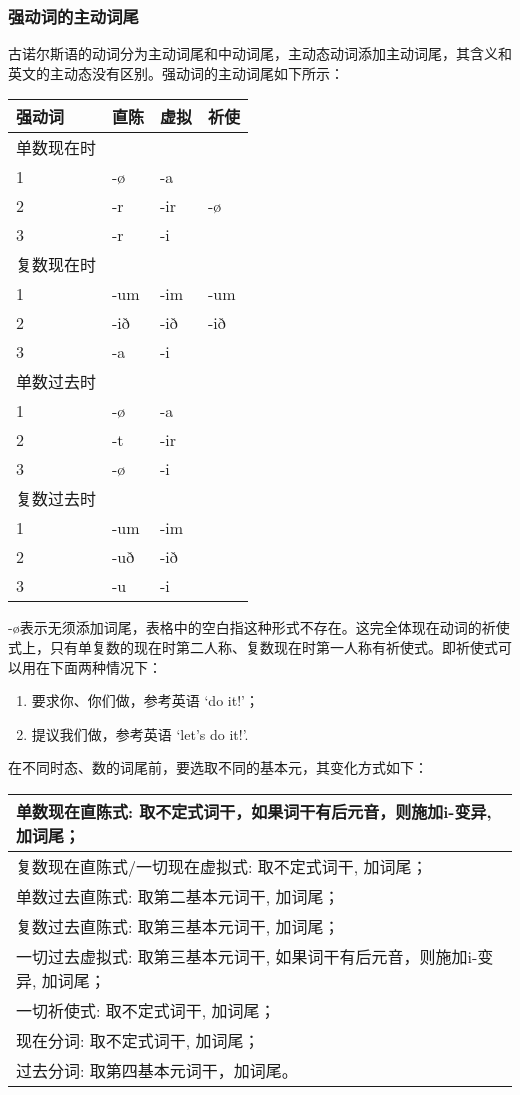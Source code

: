 \subsubsection{强动词的主动词尾}\label{ux5f3aux52a8ux8bcdux7684ux4e3bux52a8ux8bcdux5c3e}

古诺尔斯语的动词分为主动词尾和中动词尾，主动态动词添加主动词尾，其含义和英文的主动态没有区别。强动词的主动词尾如下所示：

\begin{longtable}{llll}
\toprule
强动词 & 直陈 & 虚拟 & 祈使 \\
\midrule
\endhead
\bottomrule
\endfoot
单数现在时 & & & \\
1 & -ø & -a & \\
2 & -r & -ir & -ø \\
3 & -r & -i & \\
复数现在时 & & & \\
1 & -um & -im & -um \\
2 & -ið & -ið & -ið \\
3 & -a & -i & \\
单数过去时 & & & \\
1 & -ø & -a & \\
2 & -t & -ir & \\
3 & -ø & -i & \\
复数过去时 & & & \\
1 & -um & -im & \\
2 & -uð & -ið & \\
3 & -u & -i & \\
\end{longtable}

-ø表示无须添加词尾，表格中的空白指这种形式不存在。这完全体现在动词的祈使式上，只有单复数的现在时第二人称、复数现在时第一人称有祈使式。即祈使式可以用在下面两种情况下：

\begin{enumerate}
\def\labelenumi{\arabic{enumi})}
\item
  要求你、你们做，参考英语 `do it!'；
\item
  提议我们做，参考英语 `let's do it!'.
\end{enumerate}

在不同时态、数的词尾前，要选取不同的基本元，其变化方式如下：

\begin{longtable}{l}
\toprule
单数现在直陈式: 取不定式词干，如果词干有后元音，则施加i-变异, 加词尾； \\
\midrule
\endhead
\bottomrule
\endfoot
复数现在直陈式/一切现在虚拟式: 取不定式词干, 加词尾； \\
单数过去直陈式: 取第二基本元词干, 加词尾； \\
复数过去直陈式: 取第三基本元词干, 加词尾； \\
一切过去虚拟式: 取第三基本元词干, 如果词干有后元音，则施加i-变异,
加词尾； \\
一切祈使式: 取不定式词干, 加词尾； \\
现在分词: 取不定式词干, 加词尾； \\
过去分词: 取第四基本元词干，加词尾。 \\
\end{longtable}

